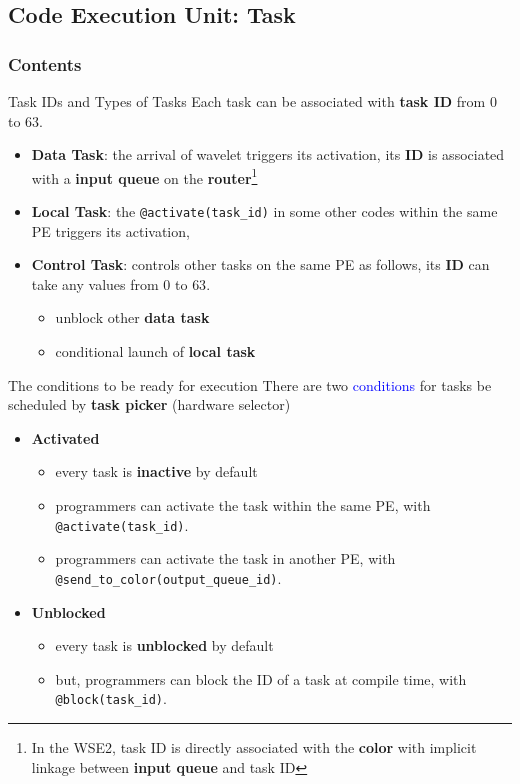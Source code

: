 \documentclass[dvipdfmx, 11pt, aspectratio=169]{beamer}   %
\begin{document}
\subsection{Code Execution Unit: Task}
\begin{frame}
    \frametitle{Contents}
    \tableofcontents[currentsubsection]
\end{frame}
\begin{frame}{Task IDs and Types of Tasks}
Each task can be associated with \textbf{task ID} from $0$ to $63$.
\begin{itemize}
    \item \textbf{Data Task}: the arrival of wavelet triggers its activation, its \textbf{ID} is associated with a \textbf{input queue} on the \textbf{router}\footnote{In the WSE2, task ID is directly associated with the \textbf{color} with implicit linkage between \textbf{input queue} and task ID}
    \item \textbf{Local Task}: the \lstinline|@activate(task_id)| in some other codes within the same PE triggers its activation, 
    \item \textbf{Control Task}: controls other tasks on the same PE as follows, its \textbf{ID} can take any values from $0$ to $63$.
    \begin{itemize}
        \item unblock other \textbf{data task}
        \item conditional launch of \textbf{local task}
    \end{itemize}
\end{itemize}
\end{frame}
\begin{frame}[fragile]{The conditions to be ready for execution}
There are two \textcolor{blue}{conditions} for tasks be scheduled by \textbf{task picker} (hardware selector)
\begin{itemize}
    \item \textbf{Activated}
    \begin{itemize}
        \item every task is \textbf{inactive} by default
        \item programmers can activate the task within the same PE, with \lstinline|@activate(task_id)|.
        \item programmers can activate the task in another PE, with \lstinline|@send_to_color(output_queue_id)|.
    \end{itemize}
    \item \textbf{Unblocked} 
    \begin{itemize}
        \item every task is \textbf{unblocked} by default
        \item but, programmers can block the ID of a task at compile time, with \lstinline|@block(task_id)|.
    \end{itemize}
\end{itemize}
\end{frame}
\end{document}
